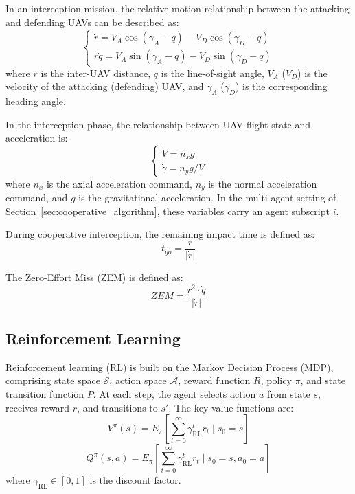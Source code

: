 \documentclass[lettersize,journal]{IEEEtran}
\begin{document}
In an interception mission, the relative motion relationship between the attacking and
defending UAVs can be described as:
\begin{equation}
\label{gongfang}
\left\{\begin{matrix}\dot{r} =V_{A}\cos(\gamma_{A}-q)-V_{D}\cos(\gamma_{D}-q) \\
r\dot{q} =V_{A}\sin(\gamma_{A}-q)-V_{D}\sin(\gamma_{D}-q)\end{matrix}\right.
\end{equation}
where $r$ is the inter-UAV distance, $q$ is the line-of-sight angle, $V_{A}$ ($V_{D}$) is the
velocity of the attacking (defending) UAV, and $\gamma_{A}$ ($\gamma_{D}$) is the
corresponding heading angle.

In the interception phase, the relationship between UAV flight state and acceleration is:
\begin{equation}
\label{guozai}
\left\{\begin{matrix}\dot{V} =n_{x} g \\
\dot{\gamma} =n_{y}g/V \end{matrix}\right.
\end{equation}
where $n_{x}$ is the axial acceleration command, $n_{y}$ is the normal acceleration command,
and $g$ is the gravitational acceleration.
In the multi-agent setting of Section~\ref{sec:cooperative_algorithm}, these variables carry
an agent subscript $i$.

During cooperative interception, the remaining impact time is defined as:
\begin{equation}
\label{shijian}
t_{go}=\frac{r}{\left|\dot{r}\right|}
\end{equation}

The Zero-Effort Miss (ZEM) is defined as:
\begin{equation}
\label{ZEM}
ZEM = \frac{r^{2}\cdot\dot{q}}{\left|\dot{r}\right|}
\end{equation}

\subsection{Reinforcement Learning}

Reinforcement learning (RL) is built on the Markov Decision Process (MDP), comprising state
space $\mathcal{S}$, action space $\mathcal{A}$, reward function $R$, policy $\pi$, and state
transition function $P$.
At each step, the agent selects action $a$ from state $s$, receives reward $r$, and
transitions to $s'$.
The key value functions are:
\begin{equation}
\label{RLV}
V^{\pi}(s)=E_{\pi}\left[\sum_{t=0}^{\infty}\gamma_{\mathrm{RL}}^{t}r_{t}\mid s_{0}=s\right]
\end{equation}
\begin{equation}
\label{RLQ}
Q^{\pi}(s,a)=E_{\pi}\left[\sum_{t=0}^{\infty}\gamma_{\mathrm{RL}}^{t}r_{t}\mid s_{0}=s,a_{0}=a\right]
\end{equation}
where $\gamma_{\mathrm{RL}}\in[0,1]$ is the discount factor.
\end{document}
